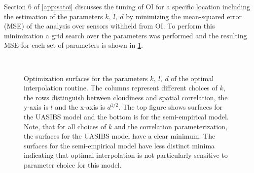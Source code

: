 Section 6 of \cref{app:satoi} discusses the tuning of OI for a
specific location including the estimation of the parameters $k,\:
l,\: d$ by minimizing the mean-squared error (MSE) of the analysis
over sensors withheld from OI.
To perform this minimization a grid search over the parameters was
performed and the resulting MSE for each set of parameters is shown in
\cref{fig:paramopt}.

\begin{figure}[p]
\centering
\captionsetup[subfigure]{labelformat=empty}
\vspace{-1em} \\
\caption[Optimization surfaces for OI parameters]{Optimization
  surfaces for the parameters $k,\: l,\: d$ of the optimal
  interpolation routine. The columns represent different choices of
  $k$, the rows distinguish between cloudiness and spatial
  correlation, the y-axis is $l$ and the x-axis is $d^{1/2}$. The top
  figure shows surfaces for the UASIBS model and the bottom is for the
  semi-empirical model. Note, that for all choices of $k$ and the
  correlation parameterization, the surfaces for the UASIBS model have
  a clear minimum. The surfaces for the semi-empirical model have less
  distinct minima indicating that optimal interpolation is not
  particularly sensitive to parameter choice for this model.}
\label{fig:paramopt}
\end{figure}


